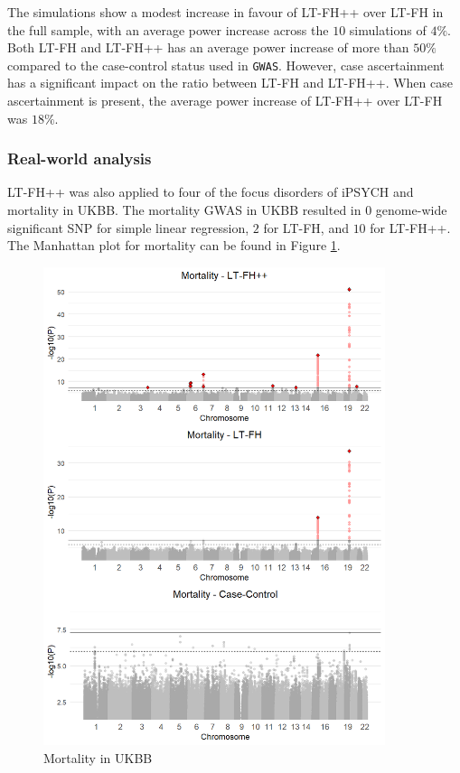 The simulations show a modest increase in favour of LT-FH++ over LT-FH in the full sample, with an average power increase across the $ 10 $ simulations of $ 4\% $. Both LT-FH and LT-FH++ has an average power increase of more than $ 50\% $ compared to the case-control status used in \texttt{GWAS}. However, case ascertainment has a significant impact on the ratio between LT-FH and LT-FH++. When case ascertainment is present, the average power increase of LT-FH++ over LT-FH was $ 18\% $.

\subsubsection{Real-world analysis}
LT-FH++ was also applied to four of the focus disorders of iPSYCH and mortality in UKBB. The mortality GWAS in UKBB resulted in $ 0 $ genome-wide significant SNP for simple linear regression, $ 2 $ for LT-FH, and $ 10 $ for LT-FH++. The Manhattan plot for mortality can be found in Figure \ref{fig:LTFH++_manhattanMortality}.
\begin{figure}
	\label{fig:LTFH++_manhattanMortality}
	\caption{Mortality in UKBB}
	\includegraphics[width=10cm]{results/manhattanPlot_mortality.png}
\end{figure}
